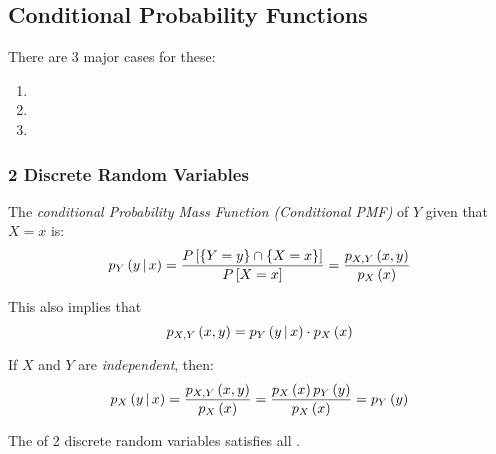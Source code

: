 		\subsection{Conditional Probability Functions} \label{subsec:Multiple Variable Conditional Probability Functions}
		There are 3 major cases for these:
			\begin{enumerate}
				\item {}
				\item {}
				\item {}
			\end{enumerate}
					
			\subsubsection{2 Discrete Random Variables} \label{subsubsec:2 Discrete Random Variables}
				\begin{definition} \label{def:2 Discrete-Conditional PMF}
					The \emph{conditional Probability Mass Function (Conditional PMF)} of $Y$ given that $X=x$ is:
					\begin{equation} \label{eq:2 Discrete-Conditional PMF}
						p_{Y} \left( y \operatorname{\vert} x \right)
							= \frac{P \left[ \lbrace Y=y \rbrace \cap \lbrace X=x \rbrace \right]}{P \left[ X=x \right]} 
							= \frac{p_{X,Y} \left( x,y \right)}{p_{X} \left( x \right)}
					\end{equation}
					\begin{remark}
						This also implies that
						\begin{equation} \label{eq:2 Discrete-Joint PMF}
							p_{X,Y} \left( x,y \right) = p_{Y} \left( y \operatorname{\vert} x \right) \cdot p_{X} \left( x \right)
						\end{equation}
					\end{remark}
					\begin{remark}
						If $X$ and $Y$ are \emph{independent}, then:
						\begin{equation} \label{eq:2 Discrete-Independent Conditional PMF}
							p_{X} \left( y \operatorname{\vert} x \right)
							= \frac{p_{X,Y} \left( x,y \right)}{p_{X} \left( x \right)}
							= \frac{p_{X} \left( x \right) p_{Y} \left( y \right)}{p_{X} \left( x \right)}
							= p_{Y} \left( y \right)
						\end{equation}
					\end{remark}
					\begin{remark}
						The  of 2 discrete random variables satisfies all .
					\end{remark}
				\end{definition}

